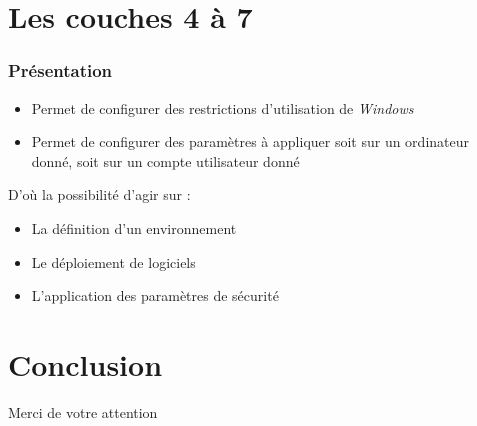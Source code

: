 \documentclass{beamer}
\begin{document}
  \section{Les couches 4 à 7}
  \begin{frame}
    \frametitle{Présentation}
    \begin{itemize}
     \item Permet de configurer des restrictions d'utilisation de \textit{Windows} 
     \item Permet de configurer des paramètres à appliquer soit sur un ordinateur donné, soit sur un compte utilisateur donné
    \end{itemize}
    D'où la possibilité d'agir sur :
    \begin{itemize}
     \item La définition d'un environnement
     \item Le déploiement de logiciels
     \item L'application des paramètres de sécurité
    \end{itemize}
  \end{frame}



  \section{Conclusion}
  
  \begin{frame}
    \begin{center}
      Merci de votre attention
    \end{center}
  \end{frame}
\end{document}
